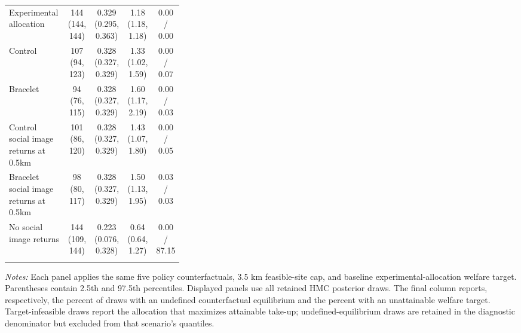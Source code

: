 \begin{longtable}{p{0.34\linewidth}cccc}
Experimental allocation & \makecell[c]{144\\(144, 144)} & \makecell[c]{0.329\\(0.295, 0.363)} & \makecell[c]{1.18\\(1.18, 1.18)} & 0.00 / 0.00 \\
Control & \makecell[c]{107\\(94, 123)} & \makecell[c]{0.328\\(0.327, 0.329)} & \makecell[c]{1.33\\(1.02, 1.59)} & 0.00 / 0.07 \\
Bracelet & \makecell[c]{94\\(76, 115)} & \makecell[c]{0.328\\(0.327, 0.329)} & \makecell[c]{1.60\\(1.17, 2.19)} & 0.00 / 0.03 \\
Control social image returns at 0.5km & \makecell[c]{101\\(86, 120)} & \makecell[c]{0.328\\(0.327, 0.329)} & \makecell[c]{1.43\\(1.07, 1.80)} & 0.00 / 0.05 \\
Bracelet social image returns at 0.5km & \makecell[c]{98\\(80, 117)} & \makecell[c]{0.328\\(0.327, 0.329)} & \makecell[c]{1.50\\(1.13, 1.95)} & 0.03 / 0.03 \\
No social image returns & \makecell[c]{144\\(109, 144)} & \makecell[c]{0.223\\(0.076, 0.328)} & \makecell[c]{0.64\\(0.64, 1.27)} & 0.00 / 87.15 \\
\addlinespace
\bottomrule
\end{longtable}
\begin{minipage}{\linewidth}
\footnotesize \textit{Notes:} Each panel applies the same five policy counterfactuals, 3.5 km feasible-site cap, and baseline experimental-allocation welfare target. Parentheses contain 2.5th and 97.5th percentiles. Displayed panels use all retained HMC posterior draws. The final column reports, respectively, the percent of draws with an undefined counterfactual equilibrium and the percent with an unattainable welfare target. Target-infeasible draws report the allocation that maximizes attainable take-up; undefined-equilibrium draws are retained in the diagnostic denominator but excluded from that scenario's quantiles.
\end{minipage}
